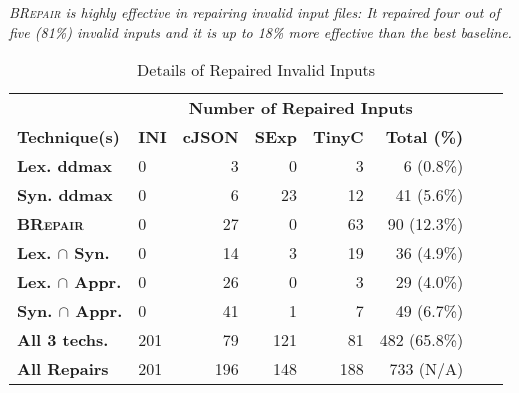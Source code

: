 \documentclass[sigconf,review,anonymous]{acmart}
\newenvironment{result}{\begin{framed}\centering\it}{\end{framed}}
\newcommand{\approach}{\textsc{BRepair}\xspace}
\begin{document}
\begin{result}
\approach is highly effective in repairing invalid input files: %
It repaired four out of five (81\%) invalid inputs and it is up to 18\% more effective than the best baseline. 
\end{result}


\begin{table}[!tbp]\centering
\caption{Details of Repaired Invalid %
Inputs}
\begin{tabular}{|l | l | r | r | r | r | r | l |}
\hline
&  \multicolumn{5}{c|}{\textbf{Number of Repaired Inputs}}  \\
\textbf{Technique(s)} & \textbf{INI} & \textbf{cJSON} & \textbf{SExp} & \textbf{TinyC} & \textbf{Total (\%)} \\
\hline
\textbf{Lex. ddmax } & 0 & 3 & 0 & 3 & 6  (0.8\%) \\
\textbf{Syn. ddmax } & 0 & 6 & 23 & 12 & 41  (5.6\%)  \\
\textbf{\approach } & 0 & 27 & 0 & 63 & 90 (12.3\%)  \\
\hline
\textbf{Lex. $\cap$ Syn.} & 0 & 14 & 3 & 19 & 36  (4.9\%) \\
\textbf{Lex. $\cap$ Appr.} & 0 & 26 & 0 & 3 & 29  (4.0\%) \\
\textbf{Syn. $\cap$ Appr.} & 0 & 41 & 1 & 7 & 49  (6.7\%) \\
\hline
\textbf{All 3 techs.}
& 201 & 79 & 121 & 81 & 482  (65.8\%)\\
\hline
\textbf{All Repairs} & 201 & 196 & 148 & 188 &  733  (N/A)\\
\hline
\end{tabular}
\label{tab:repair-complementarity}
\end{table}
\end{document}

